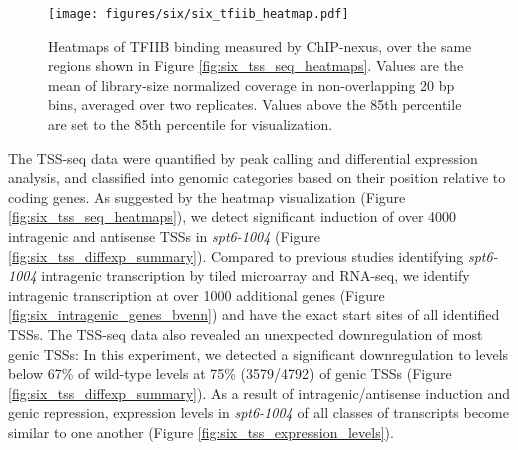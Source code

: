 \begin{wrapfigure}[19]{R}{3in}
    \centering
    \texttt{[image: figures/six/six\_tfiib\_heatmap.pdf]}
    \caption[Heatmaps of TFIIB ChIP-nexus protection from wild-type and \textit{spt6-1004} cells, over non-overlapping coding genes]{Heatmaps of TFIIB binding measured by ChIP-nexus, over the same regions shown in Figure \ref{fig:six_tss_seq_heatmaps}. Values are the mean of library-size normalized coverage in non-overlapping 20 bp bins, averaged over two replicates. Values above the 85th percentile are set to the 85th percentile for visualization.}
    \label{fig:six_tfiib_heatmap}
\end{wrapfigure}

The TSS-seq data were quantified by peak calling and differential expression analysis, and classified into genomic categories based on their position relative to coding genes.
As suggested by the heatmap visualization (Figure \ref{fig:six_tss_seq_heatmaps}), we detect significant induction of over 4000 intragenic and antisense TSSs in \textit{spt6-1004} (Figure \ref{fig:six_tss_diffexp_summary}).
Compared to previous studies identifying \textit{spt6-1004} intragenic transcription by tiled microarray and RNA-seq, we identify intragenic transcription at over 1000 additional genes (Figure \ref{fig:six_intragenic_genes_bvenn}) and have the exact start sites of all identified TSSs.
The TSS-seq data also revealed an unexpected downregulation of most genic TSSs: In this experiment, we detected a significant downregulation to levels below 67\% of wild-type levels at 75\% (3579/4792) of genic TSSs (Figure \ref{fig:six_tss_diffexp_summary}).
As a result of intragenic/antisense induction and genic repression, expression levels in \textit{spt6-1004} of all classes of transcripts become similar to one another (Figure \ref{fig:six_tss_expression_levels}).

